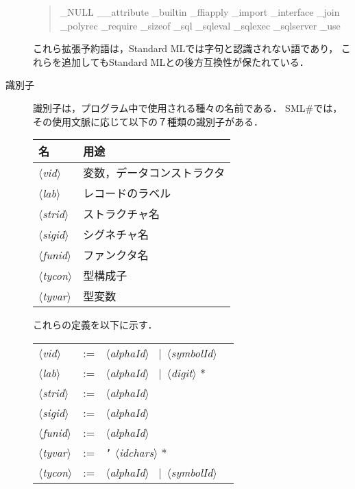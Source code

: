 \documentclass{jbook}
\newcommand{\smlsharp}{SML\#}
\newcommand{\vbar}{\mbox{\ $|$\ }}
\newcommand{\nonterm}[1]{\mbox{$\langle$}{\it #1}\mbox{$\rangle$}}
\newcommand{\term}[1]{\mbox{{\tt #1}}}
\begin{document}
\begin{description}
\begin{tt}
\begin{quote}
\_NULL
\_\_attribute
\_builtin
\_ffiapply
\_import
\_interface
\_join
\_polyrec
\_require
\_sizeof
\_sql
\_sqleval
\_sqlexec
\_sqlserver
\_use
\end{quote}
\end{tt}

	これら拡張予約語は，Standard MLでは字句と認識されない語であり，
これらを追加してもStandard MLとの後方互換性が保たれている．


\item[識別子]
\label{sec:lexicalItems:id}
	識別子は，プログラム中で使用される種々の名前である．
	\smlsharp{}では，その使用文脈に応じて以下の７種類の識別子がある．

\begin{center}
\begin{tabular}{|l|l|}
\hline
名 & 用途\\\hline
\nonterm{vid}   & 変数，データコンストラクタ\\
\nonterm{lab}   & レコードのラベル\\
\nonterm{strid} & ストラクチャ名\\
\nonterm{sigid} & シグネチャ名\\
\nonterm{funid} & ファンクタ名\\
\nonterm{tycon} & 型構成子 \\
\nonterm{tyvar} & 型変数 \\
\hline
\end{tabular}
\end{center}

これらの定義を以下に示す．

\begin{center}
\begin{tabular}{lcll}
\nonterm{vid} &:=& \nonterm{alphaId} \vbar \nonterm{symbolId}
\\
\nonterm{lab} &:=& \nonterm{alphaId} \vbar \nonterm{digit} *
\\
\nonterm{strid} &:=& \nonterm{alphaId} 
\\
\nonterm{sigid} &:=& \nonterm{alphaId} 
\\
\nonterm{funid} &:=& \nonterm{alphaId} 
\\
\nonterm{tyvar} &:=& \term{'} \nonterm{idchars} *
\\
\nonterm{tycon} &:=& \nonterm{alphaId} \vbar \nonterm{symbolId}
\end{tabular}
\end{center}%


\end{description}
\end{document}
